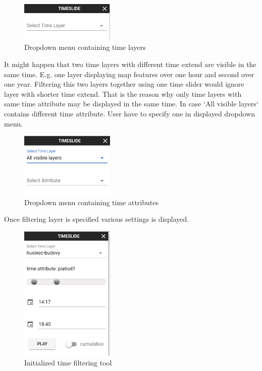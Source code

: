 \begin{figure}[h!]
	\centering
	\includegraphics[width=0.4\textwidth]{../img/time-layers-dropdown.png}
	\caption{Dropdown menu containing time layers}
	\label{fig:time-layers-drpdown}
\end{figure}

\bigskip
It might happen that two time layers with different time extend are 
visible in the same time. E.g. one layer displaying map features 
over one hour and second over one year. Filtering this two layers 
together using one time slider would ignore layer with shorter time 
extend. That is the reason why only time layers with same time 
attribute may be displayed in the same time. In case `All visible 
layers` contains different time attribute. User have to specify one 
in displayed dropdown menu.

\begin{figure}[h!]
	\centering
	\includegraphics[width=0.4\textwidth]{../img/time-attribute-dropdown.png}
	\caption{Dropdown menu containing time attributes}
	\label{fig:time-attribute-dropdown}
\end{figure}

\newpage
Once filtering layer is specified various settings is displayed. 

\begin{figure}[h!]
	\centering
	\includegraphics[width=0.4\textwidth]{../img/time-filtering-tool.png}
	\caption{Initialized time filtering tool}
	\label{fig:time-filtering-tool}
\end{figure}

